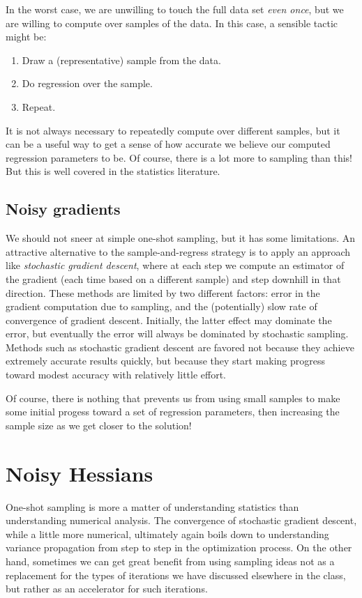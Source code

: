 \documentclass[12pt, leqno]{article} %
\begin{document}
In the worst case, we are unwilling to touch the full data set
{\em even once}, but we are willing to compute over samples of the
data.  In this case, a sensible tactic might be:
\begin{enumerate}
\item Draw a (representative) sample from the data.
\item Do regression over the sample.
\item Repeat.
\end{enumerate}
It is not always necessary to repeatedly compute over
different samples, but it can be a useful way to get a sense of
how accurate we believe our computed regression parameters to be.
Of course, there is a lot more to sampling than this!  But this
is well covered in the statistics literature.

\subsection{Noisy gradients}

We should not sneer at simple one-shot sampling, but it has some
limitations.  An attractive alternative to the sample-and-regress
strategy is to apply an approach like {\em stochastic gradient
  descent}, where at each step we compute an estimator of the gradient
(each time based on a different sample) and step downhill in that
direction.  These methods are limited by two different factors: error
in the gradient computation due to sampling, and the (potentially)
slow rate of convergence of gradient descent.  Initially, the latter
effect may dominate the error, but eventually the error will always be
dominated by stochastic sampling.  Methods such as stochastic gradient
descent are favored not because they achieve extremely accurate
results quickly, but because they start making progress toward modest
accuracy with relatively little effort.

Of course, there is nothing that prevents us from using small samples
to make some initial progess toward a set of regression parameters,
then increasing the sample size as we get closer to the solution!

\section{Noisy Hessians}

One-shot sampling is more a matter of understanding statistics than
understanding numerical analysis.  The convergence of 
stochastic gradient descent, while a little more numerical, ultimately
again boils down to understanding variance propagation from step to
step in the optimization process.  On the other hand, sometimes we can
get great benefit from using sampling ideas not as a replacement for
the types of iterations we have discussed elsewhere in the class, but
rather as an accelerator for such iterations.
\end{document}
